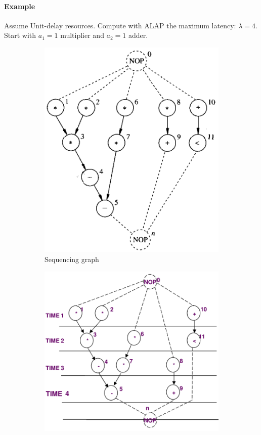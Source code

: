 \paragraph{Example}
Assume Unit-delay resources. Compute with ALAP the maximum latency: $\lambda = 4$. Start with $ a_1 = 1 $ multiplier and $ a_2 = 1 $ adder.
\begin{figure}[H]
    \centering
    \begin{subfigure}[b]{0.35\textwidth}
        \includegraphics[width=\textwidth]{./Cap4/Images/Image01.png}
        \caption{Sequencing  graph}
   		\label{fig:Seqgraph3}
    \end{subfigure}
    \quad\quad\quad
    \begin{subfigure}[b]{0.4\textwidth}
        \includegraphics[width=\textwidth]{./Cap4/Images/Image14.png}

\end{subfigure}
\end{figure}
